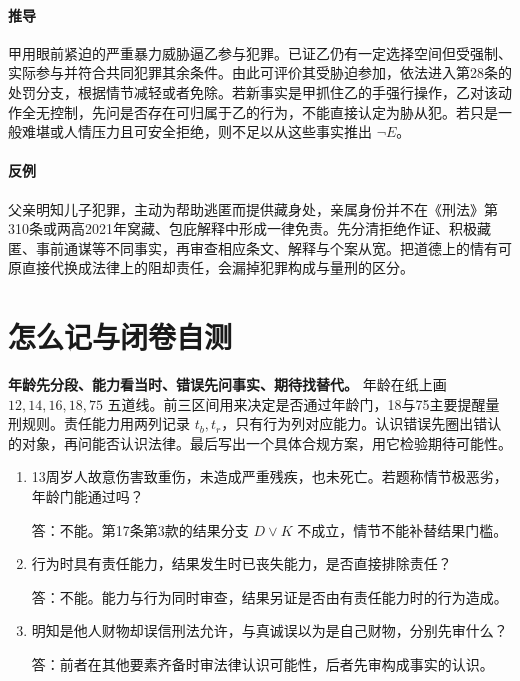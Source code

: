 \paragraph{推导}
甲用眼前紧迫的严重暴力威胁逼乙参与犯罪。已证乙仍有一定选择空间但受强制、实际参与并符合共同犯罪其余条件。由此可评价其受胁迫参加，依法进入第28条的处罚分支，根据情节减轻或者免除。若新事实是甲抓住乙的手强行操作，乙对该动作全无控制，先问是否存在可归属于乙的行为，不能直接认定为胁从犯。若只是一般难堪或人情压力且可安全拒绝，则不足以从这些事实推出 \(\neg E\)。

\paragraph{反例}
父亲明知儿子犯罪，主动为帮助逃匿而提供藏身处，亲属身份并不在《刑法》第310条或两高2021年窝藏、包庇解释中形成一律免责。先分清拒绝作证、积极藏匿、事前通谋等不同事实，再审查相应条文、解释与个案从宽。把道德上的情有可原直接代换成法律上的阻却责任，会漏掉犯罪构成与量刑的区分。

\section*{怎么记与闭卷自测}
\textbf{年龄先分段、能力看当时、错误先问事实、期待找替代。}
年龄在纸上画 \(12,14,16,18,75\) 五道线。前三区间用来决定是否通过年龄门，18与75主要提醒量刑规则。责任能力用两列记录 \(t_b,t_r\)，只有行为列对应能力。认识错误先圈出错认的对象，再问能否认识法律。最后写出一个具体合规方案，用它检验期待可能性。
\begin{enumerate}
\item 13周岁人故意伤害致重伤，未造成严重残疾，也未死亡。若题称情节极恶劣，年龄门能通过吗？\par
答：不能。第17条第3款的结果分支 \(D\lor K\) 不成立，情节不能补替结果门槛。
\item 行为时具有责任能力，结果发生时已丧失能力，是否直接排除责任？\par
答：不能。能力与行为同时审查，结果另证是否由有责任能力时的行为造成。
\item 明知是他人财物却误信刑法允许，与真诚误以为是自己财物，分别先审什么？\par
答：前者在其他要素齐备时审法律认识可能性，后者先审构成事实的认识。
\end{enumerate}
